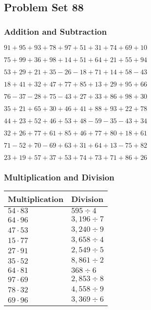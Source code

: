 \hypertarget{problem-set-88}{%
\subsection{Problem Set 88}\label{problem-set-88}}

\hypertarget{addition-and-subtraction}{%
\subsubsection{Addition and
Subtraction}\label{addition-and-subtraction}}

\(91+95+93+78+97+51+31+74+69+10\)

\(75+99+36+98+14+51+64+21+55+94\)

\(53+29+21+35-26-18+71+14+58-43\)

\(18+41+32+47+77+85+13+29+95+66\)

\(76-37-28+75-43+27+33+86+98+30\)

\(35+21+65+30+46+41+88+93+22+78\)

\(44+23+52+46+53+48-59-35-43+34\)

\(32+26+77+61+85+46+77+80+18+61\)

\(71-52+70-69+63+31+64+13-75+82\)

\(23+19+57+37+53+74+73+71+86+26\)

\hypertarget{multiplication-and-division}{%
\subsubsection{Multiplication and
Division}\label{multiplication-and-division}}

\begin{longtable}[]{@{}ll@{}}
\toprule
Multiplication & Division\tabularnewline
\midrule
\endhead
\(54\cdot83\) & \(595÷4\)\tabularnewline
\(64\cdot96\) & \(3,196÷7\)\tabularnewline
\(47\cdot53\) & \(3,240÷9\)\tabularnewline
\(15\cdot77\) & \(3,658÷4\)\tabularnewline
\(27\cdot91\) & \(2,549÷5\)\tabularnewline
\(35\cdot52\) & \(8,861÷2\)\tabularnewline
\(64\cdot81\) & \(368÷6\)\tabularnewline
\(97\cdot69\) & \(2,853÷8\)\tabularnewline
\(78\cdot32\) & \(4,558÷9\)\tabularnewline
\(69\cdot96\) & \(3,369÷6\)\tabularnewline
\bottomrule
\end{longtable}
